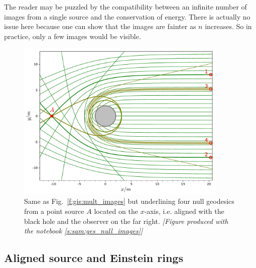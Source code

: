 \begin{remark}
The reader may be puzzled by the compatibility between an infinite number
of images from a single source and the conservation of energy. There is
actually no issue here because one can show that the images are
fainter as $n$ increases. So in practice, only a few images would be visible.
\end{remark}

\begin{figure}
\centerline{\includegraphics[width=0.9\textwidth]{ges_images_aligned.pdf}}
\caption[]{\label{f:gis:images_aligned} \footnotesize
Same as Fig.~\ref{f:gis:mult_images} but underlining four null geodesics
from a point source $A$ located on the $x$-axis, i.e.
aligned with the black hole and the observer on the far right.
\textsl{[Figure produced with the notebook \ref{s:sam:ges_null_images}]}
}
\end{figure}


\subsection{Aligned source and Einstein rings}

